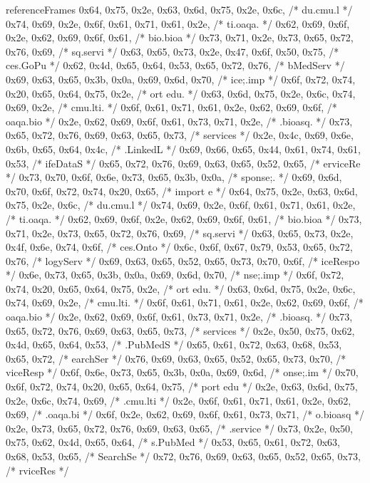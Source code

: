 \begin{chunk}{referenceFrames}
{0x64, 0x75, 0x2e, 0x63, 0x6d, 0x75, 0x2e, 0x6c, /* du.cmu.l */
0x74, 0x69, 0x2e, 0x6f, 0x61, 0x71, 0x61, 0x2e, /* ti.oaqa. */
0x62, 0x69, 0x6f, 0x2e, 0x62, 0x69, 0x6f, 0x61, /* bio.bioa */
0x73, 0x71, 0x2e, 0x73, 0x65, 0x72, 0x76, 0x69, /* sq.servi */
0x63, 0x65, 0x73, 0x2e, 0x47, 0x6f, 0x50, 0x75, /* ces.GoPu */
0x62, 0x4d, 0x65, 0x64, 0x53, 0x65, 0x72, 0x76, /* bMedServ */
0x69, 0x63, 0x65, 0x3b, 0x0a, 0x69, 0x6d, 0x70, /* ice;.imp */
0x6f, 0x72, 0x74, 0x20, 0x65, 0x64, 0x75, 0x2e, /* ort edu. */
0x63, 0x6d, 0x75, 0x2e, 0x6c, 0x74, 0x69, 0x2e, /* cmu.lti. */
0x6f, 0x61, 0x71, 0x61, 0x2e, 0x62, 0x69, 0x6f, /* oaqa.bio */
0x2e, 0x62, 0x69, 0x6f, 0x61, 0x73, 0x71, 0x2e, /* .bioasq. */
0x73, 0x65, 0x72, 0x76, 0x69, 0x63, 0x65, 0x73, /* services */
0x2e, 0x4c, 0x69, 0x6e, 0x6b, 0x65, 0x64, 0x4c, /* .LinkedL */
0x69, 0x66, 0x65, 0x44, 0x61, 0x74, 0x61, 0x53, /* ifeDataS */
0x65, 0x72, 0x76, 0x69, 0x63, 0x65, 0x52, 0x65, /* erviceRe */
0x73, 0x70, 0x6f, 0x6e, 0x73, 0x65, 0x3b, 0x0a, /* sponse;. */
0x69, 0x6d, 0x70, 0x6f, 0x72, 0x74, 0x20, 0x65, /* import e */
0x64, 0x75, 0x2e, 0x63, 0x6d, 0x75, 0x2e, 0x6c, /* du.cmu.l */
0x74, 0x69, 0x2e, 0x6f, 0x61, 0x71, 0x61, 0x2e, /* ti.oaqa. */
0x62, 0x69, 0x6f, 0x2e, 0x62, 0x69, 0x6f, 0x61, /* bio.bioa */
0x73, 0x71, 0x2e, 0x73, 0x65, 0x72, 0x76, 0x69, /* sq.servi */
0x63, 0x65, 0x73, 0x2e, 0x4f, 0x6e, 0x74, 0x6f, /* ces.Onto */
0x6c, 0x6f, 0x67, 0x79, 0x53, 0x65, 0x72, 0x76, /* logyServ */
0x69, 0x63, 0x65, 0x52, 0x65, 0x73, 0x70, 0x6f, /* iceRespo */
0x6e, 0x73, 0x65, 0x3b, 0x0a, 0x69, 0x6d, 0x70, /* nse;.imp */
0x6f, 0x72, 0x74, 0x20, 0x65, 0x64, 0x75, 0x2e, /* ort edu. */
0x63, 0x6d, 0x75, 0x2e, 0x6c, 0x74, 0x69, 0x2e, /* cmu.lti. */
0x6f, 0x61, 0x71, 0x61, 0x2e, 0x62, 0x69, 0x6f, /* oaqa.bio */
0x2e, 0x62, 0x69, 0x6f, 0x61, 0x73, 0x71, 0x2e, /* .bioasq. */
0x73, 0x65, 0x72, 0x76, 0x69, 0x63, 0x65, 0x73, /* services */
0x2e, 0x50, 0x75, 0x62, 0x4d, 0x65, 0x64, 0x53, /* .PubMedS */
0x65, 0x61, 0x72, 0x63, 0x68, 0x53, 0x65, 0x72, /* earchSer */
0x76, 0x69, 0x63, 0x65, 0x52, 0x65, 0x73, 0x70, /* viceResp */
0x6f, 0x6e, 0x73, 0x65, 0x3b, 0x0a, 0x69, 0x6d, /* onse;.im */
0x70, 0x6f, 0x72, 0x74, 0x20, 0x65, 0x64, 0x75, /* port edu */
0x2e, 0x63, 0x6d, 0x75, 0x2e, 0x6c, 0x74, 0x69, /* .cmu.lti */
0x2e, 0x6f, 0x61, 0x71, 0x61, 0x2e, 0x62, 0x69, /* .oaqa.bi */
0x6f, 0x2e, 0x62, 0x69, 0x6f, 0x61, 0x73, 0x71, /* o.bioasq */
0x2e, 0x73, 0x65, 0x72, 0x76, 0x69, 0x63, 0x65, /* .service */
0x73, 0x2e, 0x50, 0x75, 0x62, 0x4d, 0x65, 0x64, /* s.PubMed */
0x53, 0x65, 0x61, 0x72, 0x63, 0x68, 0x53, 0x65, /* SearchSe */
0x72, 0x76, 0x69, 0x63, 0x65, 0x52, 0x65, 0x73, /* rviceRes */
}
\end{chunk}
